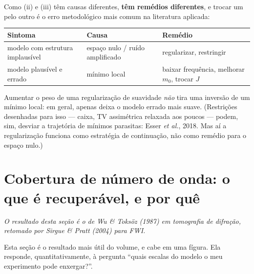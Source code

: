 \documentclass[11pt,a4paper,oneside]{report}
\begin{document}
\begin{armadilha}
Como (ii) e (iii) t\^em causas diferentes, \textbf{t\^em rem\'edios
diferentes}, e trocar um pelo outro \'e o erro metodol\'ogico mais comum na
literatura aplicada:
\begin{center}
\begin{tabular}{@{}p{4.7cm}p{4.3cm}p{5.3cm}@{}}
\toprule
\textbf{Sintoma} & \textbf{Causa} & \textbf{Rem\'edio} \\
\midrule
modelo com estrutura implaus\'ivel & espa\c{c}o nulo / ru\'ido amplificado
  & regularizar, restringir \\
modelo plaus\'ivel e errado & m\'inimo local & baixar frequ\^encia, melhorar
  $m_0$, trocar $J$ \\
\bottomrule
\end{tabular}
\end{center}
Aumentar o peso de uma regulariza\c{c}\~ao de suavidade \emph{n\~ao} tira uma
invers\~ao de um m\'inimo local: em geral, apenas deixa o modelo errado mais
suave. (Restri\c{c}\~oes desenhadas para isso --- caixa, TV assim\'etrica
relaxada aos poucos --- podem, sim, desviar a trajet\'oria de m\'inimos
parasitas: Esser \emph{et al.}, 2018. Mas a\'i a regulariza\c{c}\~ao funciona
como estrat\'egia de continua\c{c}\~ao, n\~ao como rem\'edio para o espa\c{c}o
nulo.)
\end{armadilha}

\section{Cobertura de n\'umero de onda: o que \'e recuper\'avel, e por qu\^e}
\label{sec:cobertura}

\noindent\emph{O resultado desta se\c{c}\~ao \'e o de Wu \& Toks\"oz (1987) em
tomografia de difra\c{c}\~ao, retomado por Sirgue \& Pratt (2004) para FWI.}

Esta se\c{c}\~ao \'e o resultado mais \'util do volume, e cabe em uma
f\'igura. Ela responde, quantitativamente, \`a pergunta ``quais escalas do
modelo o meu experimento pode enxergar?''.
\end{document}
